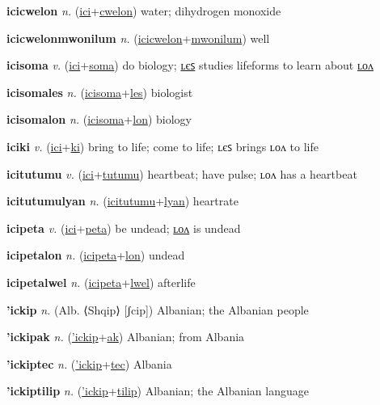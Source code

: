 \textbf{\hypertarget{icicwelon}{icicwelon}} \textit{n.} (\hyperlink{ici}{ici}+\allowbreak \hyperlink{cwelon}{cwelon})
water; dihydrogen monoxide

\textbf{\hypertarget{icicwelonmwonilum}{icicwelonmwonilum}} \textit{n.} (\hyperlink{icicwelon}{icicwelon}+\allowbreak \hyperlink{mwonilum}{mwonilum})
well

\textbf{\hypertarget{icisoma}{icisoma}} \textit{v.} (\hyperlink{ici}{ici}+\allowbreak \hyperlink{soma}{soma})
do biology; \hyperlink{icisomales}{ʟєꜱ} studies lifeforms to learn about \hyperlink{icisomalon}{ʟᴏᴧ}

\textbf{\hypertarget{icisomales}{icisomales}} \textit{n.} (\hyperlink{icisoma}{icisoma}+\allowbreak \hyperlink{les}{les})
biologist

\textbf{\hypertarget{icisomalon}{icisomalon}} \textit{n.} (\hyperlink{icisoma}{icisoma}+\allowbreak \hyperlink{lon}{lon})
biology

\textbf{\hypertarget{iciki}{iciki}} \textit{v.} (\hyperlink{ici}{ici}+\allowbreak \hyperlink{ki}{ki})
bring to life; come to life; ʟєꜱ brings ʟᴏᴧ to life

\textbf{\hypertarget{icitutumu}{icitutumu}} \textit{v.} (\hyperlink{ici}{ici}+\allowbreak \hyperlink{tutumu}{tutumu})
heartbeat; have pulse; ʟᴏᴧ has a heartbeat

\textbf{\hypertarget{icitutumulyan}{icitutumulyan}} \textit{n.} (\hyperlink{icitutumu}{icitutumu}+\allowbreak \hyperlink{lyan}{lyan})
heartrate

\textbf{\hypertarget{icipeta}{icipeta}} \textit{v.} (\hyperlink{ici}{ici}+\allowbreak \hyperlink{peta}{peta})
be undead; \hyperlink{icipetalon}{ʟᴏᴧ} is undead

\textbf{\hypertarget{icipetalon}{icipetalon}} \textit{n.} (\hyperlink{icipeta}{icipeta}+\allowbreak \hyperlink{lon}{lon})
undead

\textbf{\hypertarget{icipetalwel}{icipetalwel}} \textit{n.} (\hyperlink{icipeta}{icipeta}+\allowbreak \hyperlink{lwel}{lwel})
afterlife

\textbf{\hypertarget{'ickip}{'ickip}} \textit{n.} (Alb. ⟨Shqip⟩ [ʃcip])
Albanian; the Albanian people

\textbf{\hypertarget{'ickipak}{'ickipak}} \textit{n.} (\hyperlink{'ickip}{'ickip}+\allowbreak \hyperlink{ak}{ak})
Albanian; from Albania

\textbf{\hypertarget{'ickiptec}{'ickiptec}} \textit{n.} (\hyperlink{'ickip}{'ickip}+\allowbreak \hyperlink{tec}{tec})
Albania

\textbf{\hypertarget{'ickiptilip}{'ickiptilip}} \textit{n.} (\hyperlink{'ickip}{'ickip}+\allowbreak \hyperlink{tilip}{tilip})
Albanian; the Albanian language

